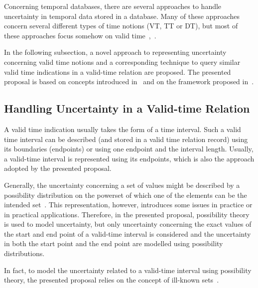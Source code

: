 Concerning temporal databases, there are several approaches to handle uncertainty in temporal data stored in a database. Many of these approaches concern several different types of time notions (VT, TT or DT), but most of these approaches focus somehow on valid time~\cite{garrido2009},~\cite{gal01}.

In the following subsection, a novel approach to representing uncertainty concerning valid time notions and a corresponding technique to query similar valid time indications in a valid-time relation are proposed. The presented proposal is based on concepts introduced in~\cite{Dubois88b} and on the framework proposed in~\cite{Pon11}.

\subsection{Handling Uncertainty in a Valid-time Relation}
A valid time indication usually takes the form of a time interval. Such a valid time interval can be described (and stored in a valid time relation record) using its boundaries (endpoints) or using one endpoint and the interval length. Usually, a valid-time interval is represented using its endpoints, which is also the approach adopted by the presented proposal. 

Generally, the uncertainty concerning a set of values might be described by a possibility distribution on the powerset of which one of the elements can be the intended set~\cite{Dubois88b}. This representation, however, introduces some issues in practice or in practical applications. Therefore, in the presented proposal, possibility theory is used to model uncertainty, but only uncertainty concerning the exact values of the start and end point of a valid-time interval is considered and the uncertainty in both the start point and the end point are modelled using possibility distributions.

In fact, to model the uncertainty related to a valid-time interval using possibility theory, the presented proposal relies on the concept of ill-known sets~\cite{Dubois88b}.


